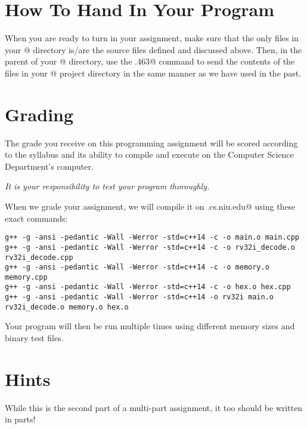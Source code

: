 \documentclass[11pt]{article}
\begin{document}
\section{How To Hand In Your Program}

When you are ready to turn in your assignment, make sure that the only files in your
@ directory is/are the source files defined and discussed above.
Then, in the parent of your @ directory, use the \verb@mailprog.463@ 
command to send the contents of the files in your @ project directory 
in the same manner as we have used in the past.


\section{Grading}

The grade you receive on this programming assignment will be scored according to the
syllabus and its ability to compile and execute on the Computer Science Department's 
computer.

{\em It is your responsibility to test your program thoroughly.} 

When we grade your assignment, we will compile it on \verb@hopper.cs.niu.edu@ 
using these exact commands:

{\small
\begin{verbatim}
g++ -g -ansi -pedantic -Wall -Werror -std=c++14 -c -o main.o main.cpp
g++ -g -ansi -pedantic -Wall -Werror -std=c++14 -c -o rv32i_decode.o rv32i_decode.cpp
g++ -g -ansi -pedantic -Wall -Werror -std=c++14 -c -o memory.o memory.cpp
g++ -g -ansi -pedantic -Wall -Werror -std=c++14 -c -o hex.o hex.cpp
g++ -g -ansi -pedantic -Wall -Werror -std=c++14 -o rv32i main.o rv32i_decode.o memory.o hex.o  
\end{verbatim}
}

Your program will then be run multiple times using different memory sizes and
binary test files.

\section{Hints}
\label{hints}

While this is the second part of a multi-part assignment, it too should be 
written in parts!
\end{document}
